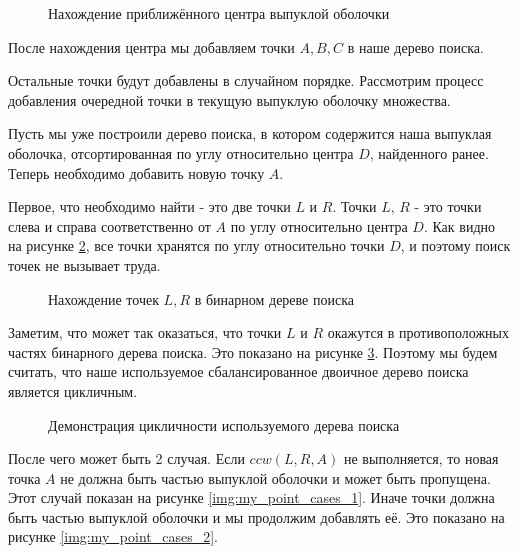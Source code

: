 \begin{figure}[H]
	{\centering
		\hfill
		\subbottom[\label{img:my_extreme_points_1}]{%
			}
		\hfill
		\subbottom[\label{img:my_extreme_points_2}]{%
			}
		\hfill
	}
	\caption{Нахождение приближённого центра выпуклой оболочки}
	\label{img:my_extreme_points}
\end{figure}

После нахождения центра мы добавляем точки $A, B, C$ в наше дерево поиска.

Остальные точки будут добавлены в случайном порядке. Рассмотрим процесс добавления очередной точки в текущую выпуклую оболочку множества.

Пусть мы уже построили дерево поиска, в котором содержится наша выпуклая оболочка, отсортированная по углу относительно центра $D$, найденного ранее. Теперь необходимо добавить новую точку $A$.

Первое, что необходимо найти - это две точки $L$ и $R$. Точки $L$, $R$ - это точки слева и справа соответственно от $A$ по углу относительно центра $D$. Как видно на рисунке \ref{img:my_find_lr}, все точки хранятся по углу относительно точки $D$, и поэтому поиск точек не вызывает труда.

\begin{figure}
	\centering
	
	\caption{Нахождение точек $L, R$ в бинарном дереве поиска}
	\label{img:my_find_lr}
\end{figure}

Заметим, что может так оказаться, что точки $L$ и $R$ окажутся в противоположных частях бинарного дерева поиска. Это показано на рисунке \ref{img:my_find_cyclic}. Поэтому мы будем считать, что наше используемое сбалансированное двоичное дерево поиска является цикличным.

\begin{figure}
	\centering
	
	\caption{Демонстрация цикличности используемого дерева поиска}
	\label{img:my_find_cyclic}
\end{figure}

После чего может быть 2 случая. Если $ccw(L, R, A)$ не выполняется, то новая точка $A$ не должна быть частью выпуклой оболочки и может быть пропущена. Этот случай показан на рисунке \ref{img:my_point_cases_1}. Иначе точки должна быть частью выпуклой оболочки и мы продолжим добавлять её. Это показано на рисунке \ref{img:my_point_cases_2}.

